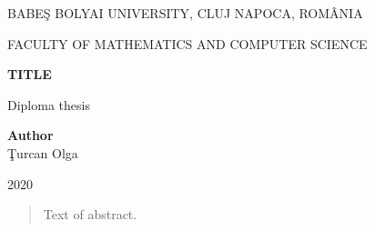 \documentclass[a4paper,12pt]{report}
\begin{document}
\begin{titlepage}
  \sloppy
  \begin{center}
    BABE\c S BOLYAI UNIVERSITY, CLUJ NAPOCA, ROM\^ ANIA

    FACULTY OF MATHEMATICS AND COMPUTER SCIENCE

    \vspace{6cm}

    \Huge \textbf{TITLE}

    \vspace{1cm}

    \normalsize Diploma thesis

  \end{center}


  \vspace{5cm}

  \begin{flushright}
    \Large{\textbf{Author}}\\
    \c Turcan Olga
  \end{flushright}

  \vspace{4cm}

  \begin{center}
    2020
  \end{center}

\end{titlepage}


\begin{abstract}
  Text of abstract.
\end{abstract}


\tableofcontents

\newpage

\listoffigures
\listoftables

\newpage


\newpage











\end{document}
